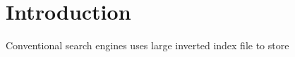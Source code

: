 \setcounter{page}{1}  %
\cite{Sakai2007}
\chapter{Introduction}
Conventional search engines uses large inverted index file to store 



